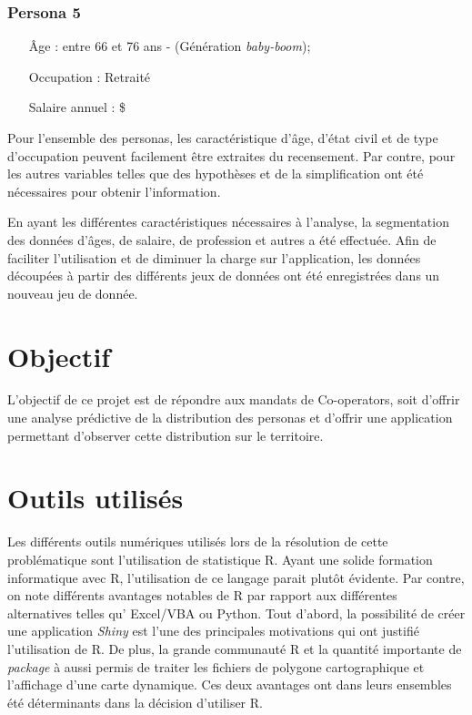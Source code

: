 \documentclass[11pt,french]{article}\usepackage[]{graphicx}\usepackage[]{color}
\begin{document}
\subsubsection*{Persona 5}
\label{per5}
\begin{itemize}
\item[Âge :] entre 66 et 76 ans - (Génération \emph{baby-boom});
\item[Occupation :] Retraité
\item[Salaire annuel :]  \$
\end{itemize}
\bigskip

Pour l'ensemble des personas,  les caractéristique d'âge, d’état civil et de type d'occupation peuvent facilement être extraites du recensement. Par contre, pour les autres variables telles que  des hypothèses et de la simplification ont été nécessaires pour obtenir l'information.
\newline

En ayant les différentes caractéristiques nécessaires à l’analyse, la segmentation des données d’âges, de salaire, de profession et autres a été effectuée. Afin de faciliter l’utilisation et de diminuer la charge sur l’application, les données découpées à partir des différents jeux de données ont été enregistrées dans un nouveau jeu de donnée.

\section{Objectif}

L'objectif de ce projet est de répondre aux mandats de Co-operators, soit d'offrir une analyse prédictive de la distribution des personas et d'offrir une application permettant d'observer cette distribution sur le territoire.

\section{Outils utilisés}

Les différents outils numériques utilisés lors de la résolution de cette problématique sont l'utilisation de statistique R. Ayant une solide formation informatique avec R, l'utilisation de ce langage parait plutôt évidente. Par contre, on note différents avantages notables de R par rapport aux différentes alternatives telles qu’ Excel/VBA ou Python. Tout d'abord, la possibilité de créer une application \emph{Shiny} est l'une des principales motivations qui ont justifié l'utilisation de R. De plus, la grande communauté R et la quantité importante de \emph{package} à aussi permis de traiter les fichiers de polygone cartographique et l'affichage d'une carte dynamique. Ces deux avantages ont dans leurs ensembles été déterminants dans la décision d'utiliser R.
\bigskip
\end{document}
